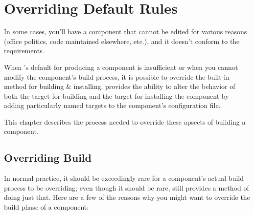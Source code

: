%
%
%
%
\chapter{Overriding Default Rules} \label{chap:overriding}

In some cases, you'll have a component \makefile that cannot be edited
for various reasons (office politics, code maintained elsewhere,
etc.), and it doesn't conform to the \lmsbw requirements.

When \lmsbw's default for producing a component is insufficient or
when you cannot modify the component's build process, it is possible
to override the built-in method for building \& installing.  \lmsbw
provides the ability to alter the behavior of both the \makefile
target for building and the target for installing the component by
adding particularly named targets to the component's configuration
file.


This chapter describes the process needed to override these apsects of
building a component.


\section{Overriding Build}

In normal practice, it should be exceedingly rare for a
component's actual build process to be overriding; even though it
should be rare, \lmsbw still provides a method of doing just that.
Here are a few of the reasons why you might want to override the build
phase of a component:

